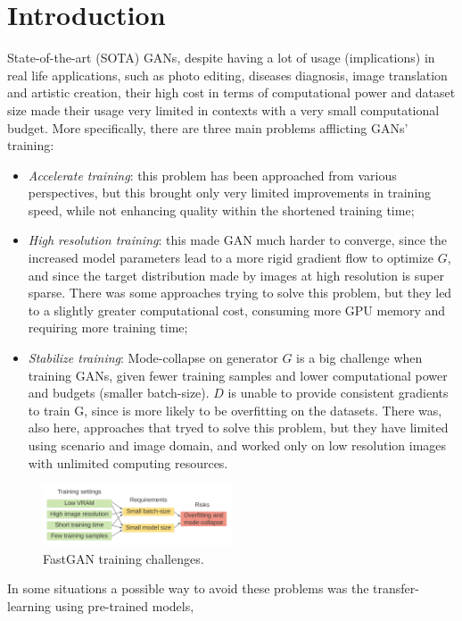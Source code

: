 \documentclass[12pt]{article}
\begin{document}
\section{Introduction}
\large
State-of-the-art (SOTA) GANs, despite having a lot of usage (implications) in real life applications, 
such as photo editing, diseases diagnosis, image translation and artistic creation, their high cost in 
terms of computational power and dataset size made their usage very limited in contexts with a very small
computational budget. More specifically, there are three main problems afflicting GANs' training:
\begin{itemize}
	\setlength\itemsep{0.01em}
	\item \textit{Accelerate training}: this problem has been approached from various perspectives, but this brought
			only very limited improvements in training speed, while not enhancing quality within the shortened training time;
	\item \textit{High resolution training}: this made GAN much harder to converge, since the increased model parameters
			lead to a more rigid gradient flow to optimize $G$, and since the target distribution made by images at high resolution
			is super sparse. There was some approaches trying to solve this problem, but they led to a slightly greater computational
			cost, consuming more GPU memory and requiring more training time;
	\item \textit{Stabilize training}: Mode-collapse on generator $G$ is a big challenge when training GANs, given fewer training
			samples and lower computational power and budgets (smaller batch-size). $D$ is unable to provide consistent gradients to 
			train G, since is more likely to be overfitting on the datasets. There was, also here, approaches that tryed to solve this 
			problem, but they have limited using scenario and image domain, and worked only on low resolution images with unlimited computing
			resources.
\end{itemize}
\begin{figure}[H]
	\centering
	\includegraphics[width=0.5\textwidth]{Images/problems.png}
	\caption{FastGAN training challenges.} 
\end{figure}
In some situations a possible way to avoid these problems was the transfer-learning using pre-trained models,
\end{document}
